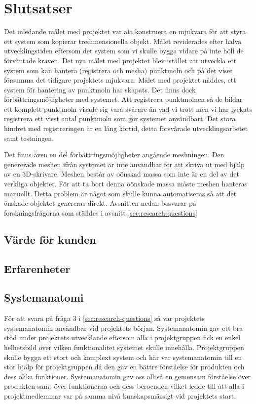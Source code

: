 \chapter{Slutsatser}
\label{cha:conclusion}
Det inledande målet med projektet var att konstruera en mjukvara för att styra ett system som kopierar tredimensionella objekt. Målet reviderades efter halva utvecklingstiden eftersom det system som vi skulle bygga vidare på inte höll de förväntade kraven. Det nya målet med projektet blev istället att utveckla ett system som kan hantera (registrera och mesha) punktmoln och på det viset försumma det tidigare projektets mjukvara. Målet med projektet nåddes, ett system för hantering av punktmoln har skapats. Det finns dock förbättringsmöjligheter med systemet. Att registrera punktmolnen så de bildar ett komplett punktmoln visade sig vara svårare än vad vi trott men vi har lyckats registrera ett visst antal punktmoln som gör systemet användbart. Det stora hindret med registreringen är en lång körtid, detta försvårade utvecklingsarbetet samt testningen. 

Det finns även en del förbättringsmöjligheter angående meshningen. Den genererade meshen ifrån systemet är inte användbar för att skriva ut med hjälp av en 3D-skrivare. Meshen består av oönskad massa som inte är en del av det verkliga objektet. För att ta bort denna oönskade massa måste meshen hanteras manuellt. Detta problem är något som skulle kunna automatiseras så att det önskade objektet genereras direkt. Avsnitten nedan besvarar på forskningsfrågorna som ställdes i avsnitt \ref{sec:research-questions}

\section{Värde för kunden}
\section{Erfarenheter}
\section{Systemanatomi}
För att svara på fråga 3 i \ref{sec:research-questions} så var projektets systemanatomin användbar vid projektets början. Systemanatomin gav ett bra stöd under projektets utvecklande eftersom alla i projektgruppen fick en enkel helhetsbild över vilken funktionalitet systemet skulle innehålla. Projektgruppen skulle bygga ett stort och komplext system och här var systemanatomin till en stor hjälp för projektgruppen då den gav en bättre förståelse för produkten och dess olika funktioner. Systemanatomin gav oss alltså en gemensam förståelse över produkten samt över funktionerna och dess beroenden vilket ledde till att alla i projektmedlemmar var på samma nivå kunskapsmässigt vid projektets start.

